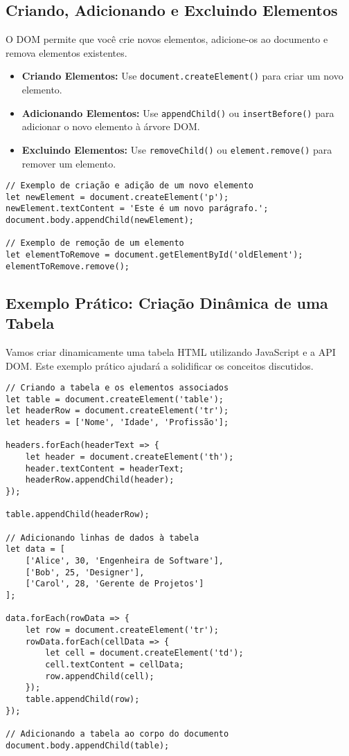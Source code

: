 \subsection{Criando, Adicionando e Excluindo Elementos}
O DOM permite que você crie novos elementos, adicione-os ao documento e remova elementos existentes.

\begin{itemize}
    \item \textbf{Criando Elementos:} Use \texttt{document.createElement()} para criar um novo elemento.
    \item \textbf{Adicionando Elementos:} Use \texttt{appendChild()} ou \texttt{insertBefore()} para adicionar o novo elemento à árvore DOM.
    \item \textbf{Excluindo Elementos:} Use \texttt{removeChild()} ou \texttt{element.remove()} para remover um elemento.
\end{itemize}

\begin{verbatim}
// Exemplo de criação e adição de um novo elemento
let newElement = document.createElement('p');
newElement.textContent = 'Este é um novo parágrafo.';
document.body.appendChild(newElement);

// Exemplo de remoção de um elemento
let elementToRemove = document.getElementById('oldElement');
elementToRemove.remove();
\end{verbatim}

\subsection{Exemplo Prático: Criação Dinâmica de uma Tabela}
Vamos criar dinamicamente uma tabela HTML utilizando JavaScript e a API DOM. Este exemplo prático ajudará a solidificar os conceitos discutidos.

\begin{verbatim}
// Criando a tabela e os elementos associados
let table = document.createElement('table');
let headerRow = document.createElement('tr');
let headers = ['Nome', 'Idade', 'Profissão'];

headers.forEach(headerText => {
    let header = document.createElement('th');
    header.textContent = headerText;
    headerRow.appendChild(header);
});

table.appendChild(headerRow);

// Adicionando linhas de dados à tabela
let data = [
    ['Alice', 30, 'Engenheira de Software'],
    ['Bob', 25, 'Designer'],
    ['Carol', 28, 'Gerente de Projetos']
];

data.forEach(rowData => {
    let row = document.createElement('tr');
    rowData.forEach(cellData => {
        let cell = document.createElement('td');
        cell.textContent = cellData;
        row.appendChild(cell);
    });
    table.appendChild(row);
});

// Adicionando a tabela ao corpo do documento
document.body.appendChild(table);
\end{verbatim}

